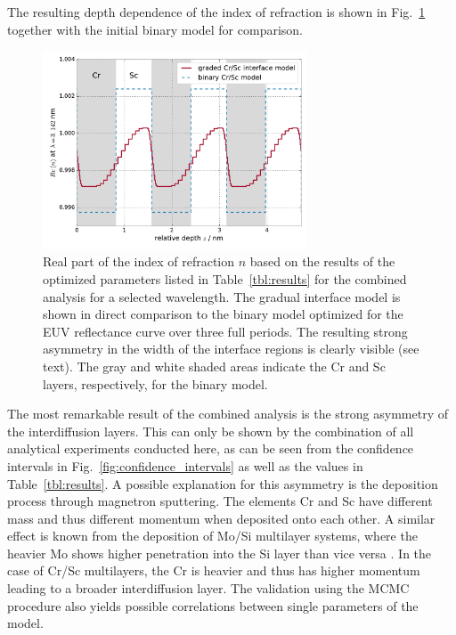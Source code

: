 The resulting depth dependence of the index of refraction is shown in 
Fig.~\ref{fig:electron_density_profile} together with the initial binary model 
for comparison.
\begin{figure}[htbp]
  \centering
  \includegraphics[width=0.7\textwidth]{images/real_model}
  \caption{Real part of the index of refraction $n$  based on the results of 
the optimized parameters listed in Table~\ref{tbl:results} for the combined 
analysis for a selected wavelength. The gradual interface model is shown in 
direct comparison to the binary model optimized for the EUV reflectance curve 
over three full periods. The resulting strong asymmetry in the width of the 
interface regions is clearly visible (see text). The gray and white shaded 
areas indicate the Cr and Sc layers, respectively, for the binary model.}
  \label{fig:electron_density_profile}
\end{figure}
The most remarkable result of the combined analysis is the strong asymmetry of 
the interdiffusion layers. This can only be shown by the combination of all 
analytical experiments conducted here, as can be seen from the confidence 
intervals in Fig.~\ref{fig:confidence_intervals} as well as the values in 
Table~\ref{tbl:results}. A possible explanation for this asymmetry is the 
deposition process through magnetron sputtering. The elements Cr and Sc have 
different mass and thus different momentum when deposited onto each other. A 
similar effect is known from the deposition of Mo/Si multilayer systems, where 
the heavier Mo shows higher penetration into the Si layer than vice versa 
\cite{petford-long_highresolution_1987}. In the case of Cr/Sc multilayers, the Cr is heavier and 
thus has higher momentum leading to a broader interdiffusion layer.
The validation using the MCMC procedure also yields possible correlations 
between single parameters of the model.

\cite{haase_multiparameter_2016}


